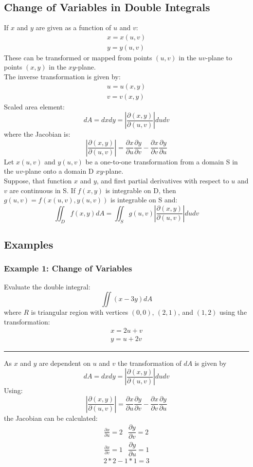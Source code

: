 \subsection{Change of Variables in Double Integrals}
If $x$ and $y$ are given as a function of $u$ and $v$:
$$\begin{array}{c}
x=x(u,v)\\
y=y(u,v)
\end{array}$$
These can be transformed or mapped from points $(u,v)$ in the $uv$-plane to points $(x,y)$ in the $xy$-plane.\\
The inverse transformation is given by:
$$\begin{array}{c}
  u=u(x,y)\\
  v=v(x,y)
\end{array}$$
Scaled area element:
$$dA = dxdy=\left|\frac{\partial(x,y)}{\partial(u,v)}\right|dudv$$
where the Jacobian is:
$$\left|\frac{\partial(x,y)}{\partial(u,v)}\right|=\frac{\partial x}{\partial u}\frac{\partial y}{\partial v}-\frac{\partial x}{\partial v}\frac{\partial y}{\partial u}$$
Let $x(u, v)$ and $y(u,v)$ be a one-to-one transformation from a domain S in the $uv$-plane onto a domain D
$xy$-plane.\\
Suppose, that function $x$ and $y$, and first partial derivatives with respect to $u$ and $v$ are continuous in S.
If $f(x,y)$ is integrable on D, then $g(u,v)=f(x(u,v),y(u,v))$ is integrable on S and:
$$\iint_D f(x,y)dA=\iint_S g(u,v)\left|\frac{\partial(x,y)}{\partial(u,v)}\right|dudv$$

\subsection{Examples}
\subsubsection{Example 1: Change of Variables}
Evaluate the double integral:
$$\iint (x-3y)dA$$
where $R$ is triangular region with vertices $(0,0)$, $(2,1)$, and $(1,2)$ using the transformation:
$$\begin{array}{c}
  x=2u+v\\
  y=u+2v
\end{array}$$
\noindent\rule{\textwidth}{1pt}
As $x$ and $y$ are dependent on $u$ and $v$ the transformation of $dA$ is given by 
$$dA = dxdy=\left|\frac{\partial(x,y)}{\partial(u,v)}\right|dudv$$
Using:
$$\left|\frac{\partial(x,y)}{\partial(u,v)}\right|=\frac{\partial x}{\partial u}\frac{\partial y}{\partial v}-\frac{\partial x}{\partial v}\frac{\partial y}{\partial u}$$
the Jacobian can be calculated:
\begin{eqnarray*}
  \frac{\partial x}{\partial u}=2&
  \dfrac{\partial y}{\partial v}=2\\
  \frac{\partial x}{\partial v}=1&
  \dfrac{\partial y}{\partial u}=1
\end{eqnarray*}
$$2*2-1*1=3$$

